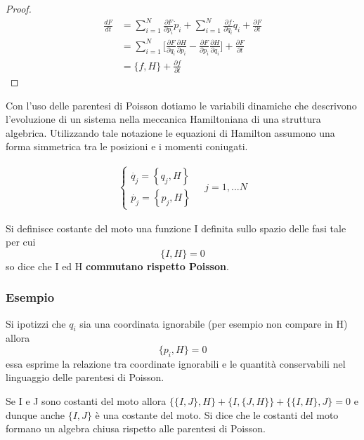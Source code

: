 \begin{proof}
\begin{align*}
\frac{d F}{d t} & = \sum_{i = 1}^N\frac{\partial F}{\partial p_i} \dot{p}_i+ \sum_{i=1}^N\frac{\partial f}{\partial q_i} \dot{q}_i+\frac{\partial F}{\partial t} \\[0.5em]
& = \sum_{i=1}^N \Big [\frac{\partial F}{\partial q_i} \frac{\partial H}{\partial p_i} -\frac{\partial F}{\partial p_i} \frac{\partial H}{\partial q_i} \Big ] + \frac{\partial F}{\partial t} \\[0.5em]
& =\{f, H\}+\frac{\partial f}{\partial t}
\end{align*}
\end{proof}
\noindent Con l'uso delle parentesi di Poisson dotiamo le variabili dinamiche che descrivono l'evoluzione di un sistema nella meccanica Hamiltoniana di una struttura algebrica. Utilizzando tale notazione le equazioni di Hamilton assumono una forma simmetrica tra le posizioni e i momenti coniugati.

\begin{align}
	\left\{\begin{array}{l}
		\dot{q_j}=\left\{q_j, H\right\} \\
		\dot{p_j}=\left\{p_j, H\right\}
	\end{array}\right.
	\quad j=1,...N
\end{align}
\vspace{0.1in}
\begin{definition}
	Si definisce costante del moto una funzione I definita sullo spazio delle fasi tale per cui
	\begin{equation}
		\Big \{ I,H \Big \}=0
	\end{equation}
	so dice che I ed H \textbf{commutano rispetto Poisson}. 
\end{definition}

\subsubsection{Esempio}

Si ipotizzi che $q_i$ sia una coordinata ignorabile (per esempio non compare in H) allora 
\begin{equation*}
	\Big \{ p_i,H \Big \} = 0
\end{equation*}
essa esprime la relazione tra coordinate ignorabili e le quantit\`{a} conservabili nel linguaggio delle parentesi di Poisson. 
\newline
\begin{remark}
	Se I e J sono costanti del moto allora $\{\{I,J\},H\} + \{I,\{J,H\}\} + \{\{I,H\},J\} = 0$ e dunque anche $\{I,J\}$ \`{e} una costante del moto. Si dice che le costanti del moto formano un algebra chiusa rispetto alle parentesi di Poisson.
\end{remark}

